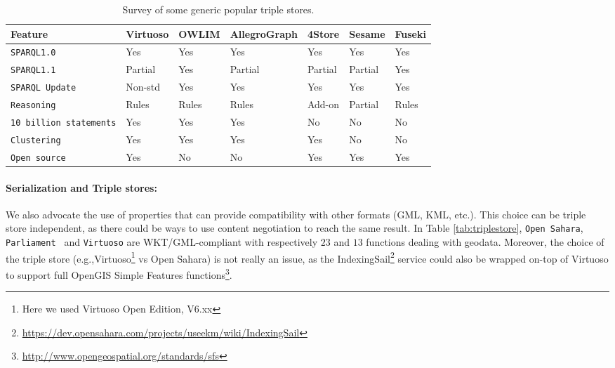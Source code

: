 \begin{table}[htb!]
    \caption{Survey of some generic popular triple stores.}
    \label{tab:generictriples}
    \centering
    \begin{tabular}{lllllll}
    \toprule
    \textbf{Feature} & \textbf{Virtuoso} & \textbf{OWLIM} & \textbf{AllegroGraph} & \textbf{4Store} &  \textbf{Sesame} & \textbf{Fuseki} \\
    \toprule
    \texttt{SPARQL1.0} & Yes & Yes & Yes & Yes & Yes & Yes \\
    \midrule
    \texttt{SPARQL1.1} & Partial & Yes & Partial & Partial & Partial & Yes \\
    \midrule
    \texttt{SPARQL Update} & Non-std & Yes & Yes & Yes & Yes & Yes \\
    \midrule
    \texttt{Reasoning} & Rules & Rules & Rules & Add-on & Partial & Rules \\
    \midrule
    \texttt{10 billion statements} & Yes & Yes & Yes & No & No & No \\
    \midrule
    \texttt{Clustering} & Yes & Yes & Yes & Yes & No & No \\
    \midrule
    \texttt{Open source} & Yes & No & No & Yes & Yes & Yes \\
    \bottomrule
    \end{tabular}
\end{table}

\paragraph{Serialization and Triple stores:} We also advocate the use of properties that can provide compatibility with other formats (GML, KML, etc.). This choice can be triple store independent, as there could be ways to use content negotiation to reach the same result. In Table \ref{tab:triplestore}, \texttt{Open Sahara}, \texttt{Parliament } and  \texttt{Virtuoso} are WKT/GML-compliant with respectively $23$ and $13$ functions dealing with geodata. Moreover, the choice of the triple store (e.g.,Virtuoso\footnote{Here we used Virtuoso Open Edition, V6.xx} vs Open Sahara) is not really an issue, as the IndexingSail\footnote{\url{https://dev.opensahara.com/projects/useekm/wiki/IndexingSail}} service could also be wrapped on-top of Virtuoso to support full OpenGIS Simple Features functions\footnote{\url{http://www.opengeospatial.org/standards/sfs}}.


